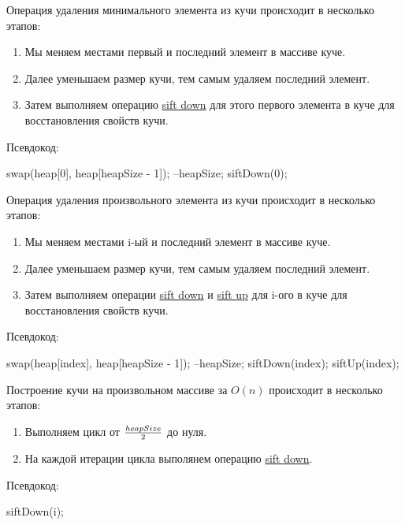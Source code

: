 \begin{operation}
    Операция удаления минимального элемента из кучи происходит в несколько этапов:
    \begin{enumerate}
        \item Мы меняем местами первый и последний элемент в массиве куче.
        \item Далее уменьшаем размер кучи, тем самым удаляем последний элемент.
        \item Затем выполняем операцию \hyperlink{sd}{sift down}
        для этого первого элемента в куче для восстановления свойств кучи.
    \end{enumerate}
    Псевдокод:
    \begin{algorithmic}[0]
            \State swap(heap[0], heap[heapSize - 1]);
            \State --heapSize;
            \State siftDown(0);
        \EndFunction
    \end{algorithmic}
\end{operation}

\begin{operation}
    Операция удаления произвольного элемента из кучи происходит в несколько этапов:
    \begin{enumerate}
        \item Мы меняем местами i-ый и последний элемент в массиве куче.
        \item Далее уменьшаем размер кучи, тем самым удаляем последний элемент.
        \item Затем выполняем операции \hyperlink{sd}{sift down} и \hyperlink{su}{sift up}
        для i-ого в куче для восстановления свойств кучи.
    \end{enumerate}
    Псевдокод:
    \begin{algorithmic}[0]
            \State swap(heap[index], heap[heapSize - 1]);
            \State --heapSize;
            \State siftDown(index);
            \State siftUp(index);
        \EndFunction
    \end{algorithmic}
\end{operation}

\begin{operation}
    Построение кучи на произвольном массиве за $O(n)$ происходит в несколько этапов:
    \begin{enumerate}
        \item Выполняем цикл от $\large{\frac{heapSize}{2}} $ до нуля.
        \item На каждой итерации цикла выполянем операцию \hyperlink{sd}{sift down}.
    \end{enumerate}
    Псевдокод:
    \begin{algorithmic}[0]
                \State siftDown(i);
            \EndFor
        \EndFunction
    \end{algorithmic}
\end{operation}

